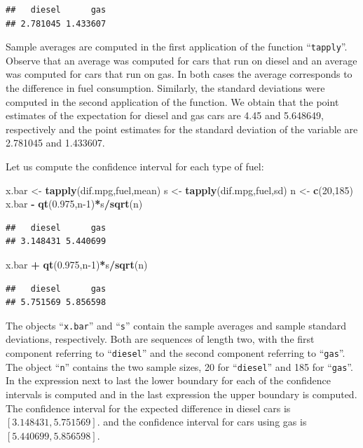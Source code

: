 \documentclass[
]{krantz}
\makeatletter
\newenvironment{Shaded}{\begin{snugshade}}{\end{snugshade}}
\newcommand{\DecValTok}[1]{\textcolor[rgb]{0.00,0.00,0.81}{#1}}
\newcommand{\FloatTok}[1]{\textcolor[rgb]{0.00,0.00,0.81}{#1}}
\newcommand{\KeywordTok}[1]{\textcolor[rgb]{0.13,0.29,0.53}{\textbf{#1}}}
\newcommand{\NormalTok}[1]{#1}
\newcommand{\OperatorTok}[1]{\textcolor[rgb]{0.81,0.36,0.00}{\textbf{#1}}}
\newcommand{\StringTok}[1]{\textcolor[rgb]{0.31,0.60,0.02}{#1}}
\newenvironment{kframe}{%
\medskip{}
\setlength{\fboxsep}{.8em}
 \def\at@end@of@kframe{}%
 \ifinner\ifhmode%
  \def\at@end@of@kframe{\end{minipage}}%
  \begin{minipage}{\columnwidth}%
 \fi\fi%
 \def\FrameCommand##1{\hskip\@totalleftmargin \hskip-\fboxsep
 \colorbox{shadecolor}{##1}\hskip-\fboxsep
     \hskip-\linewidth \hskip-\@totalleftmargin \hskip\columnwidth}%
 \MakeFramed {\advance\hsize-\width
   \@totalleftmargin\z@ \linewidth\hsize
   \@setminipage}}%
 {\par\unskip\endMakeFramed%
 \at@end@of@kframe}
\renewenvironment{Shaded}{\begin{kframe}}{\end{kframe}}
\theoremstyle{definition}
\theoremstyle{definition}
\theoremstyle{definition}
\theoremstyle{remark}
\makeatother
\begin{document}
\begin{verbatim}
##   diesel      gas 
## 2.781045 1.433607
\end{verbatim}

Sample averages are computed in the first application of the function
``\texttt{tapply}''. Observe that an average was computed for cars that run on
diesel and an average was computed for cars that run on gas. In both
cases the average corresponds to the difference in fuel consumption.
Similarly, the standard deviations were computed in the second
application of the function. We obtain that the point estimates of the
expectation for diesel and gas cars are 4.45 and 5.648649, respectively
and the point estimates for the standard deviation of the variable are
2.781045 and 1.433607.

Let us compute the confidence interval for each type of fuel:

\begin{Shaded}
\begin{Highlighting}[]
\NormalTok{x.bar <-}\StringTok{ }\KeywordTok{tapply}\NormalTok{(dif.mpg,fuel,mean)}
\NormalTok{s <-}\StringTok{ }\KeywordTok{tapply}\NormalTok{(dif.mpg,fuel,sd)}
\NormalTok{n <-}\StringTok{ }\KeywordTok{c}\NormalTok{(}\DecValTok{20}\NormalTok{,}\DecValTok{185}\NormalTok{)}
\NormalTok{x.bar }\OperatorTok{-}\StringTok{ }\KeywordTok{qt}\NormalTok{(}\FloatTok{0.975}\NormalTok{,n}\DecValTok{-1}\NormalTok{)}\OperatorTok{*}\NormalTok{s}\OperatorTok{/}\KeywordTok{sqrt}\NormalTok{(n)}
\end{Highlighting}
\end{Shaded}

\begin{verbatim}
##   diesel      gas 
## 3.148431 5.440699
\end{verbatim}

\begin{Shaded}
\begin{Highlighting}[]
\NormalTok{x.bar }\OperatorTok{+}\StringTok{ }\KeywordTok{qt}\NormalTok{(}\FloatTok{0.975}\NormalTok{,n}\DecValTok{-1}\NormalTok{)}\OperatorTok{*}\NormalTok{s}\OperatorTok{/}\KeywordTok{sqrt}\NormalTok{(n)}
\end{Highlighting}
\end{Shaded}

\begin{verbatim}
##   diesel      gas 
## 5.751569 5.856598
\end{verbatim}

The objects ``\texttt{x.bar}'' and ``\texttt{s}'' contain the sample averages and sample
standard deviations, respectively. Both are sequences of length two,
with the first component referring to ``\texttt{diesel}'' and the second
component referring to ``\texttt{gas}''. The object ``\texttt{n}'' contains the two sample
sizes, 20 for ``\texttt{diesel}'' and 185 for ``\texttt{gas}''. In the expression next to
last the lower boundary for each of the confidence intervals is computed
and in the last expression the upper boundary is computed. The
confidence interval for the expected difference in diesel cars is
\([3.148431, 5.751569]\). and the confidence interval for cars using gas
is \([5.440699, 5.856598]\).
\end{document}
